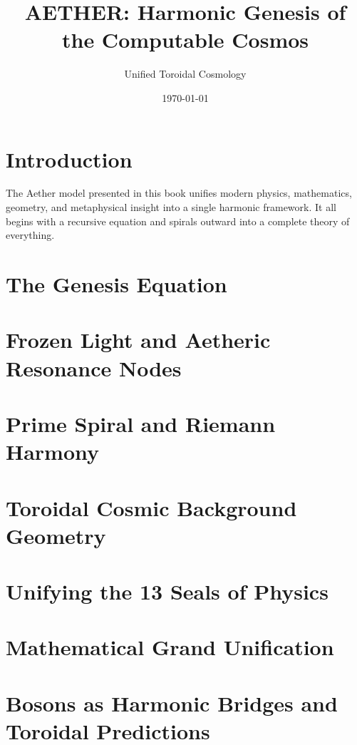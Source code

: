 \documentclass[12pt]{book}
\title{AETHER: Harmonic Genesis of the Computable Cosmos}
\author{Unified Toroidal Cosmology}
\date{\today}
\begin{document}
\maketitle
\tableofcontents
\newpage

\chapter{Introduction}
The Aether model presented in this book unifies modern physics, mathematics, geometry, and metaphysical insight into a single harmonic framework. It all begins with a recursive equation and spirals outward into a complete theory of everything.

\chapter{The Genesis Equation}


\chapter{Frozen Light and Aetheric Resonance Nodes}


\chapter{Prime Spiral and Riemann Harmony}


\chapter{Toroidal Cosmic Background Geometry}


\chapter{Unifying the 13 Seals of Physics}


\chapter{Mathematical Grand Unification}


\chapter{Bosons as Harmonic Bridges and Toroidal Predictions}

\end{document}
